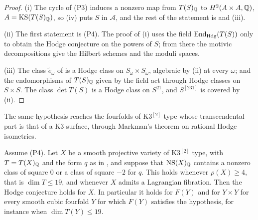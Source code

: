 \begin{proof}
(i) The cycle of (P3) induces a nonzero map from $T(S)_{\mathbb{Q}}$ to
$H^{2}(A\times A,\mathbb{Q})$, $A=\mathrm{KS}(T(S)_{\mathbb{Q}})$, so (iv)
puts $S$ in $\mathcal{A}$, and the rest of the statement is
 and (iii).

(ii) The first statement is (P4). The proof of (i) uses
the field $\operatorname{End}_{\mathrm{Hdg}}(T(S))$ only to obtain the Hodge conjecture on
the powers of $S$; from there the motivic decompositions
\cite{dCM02,Bue20,FFZ21} give the Hilbert schemes and the moduli spaces.

(iii) The class $\tilde e_{\omega}$ of  is a Hodge class on
$S_{\omega}\times S_{\omega}$, algebraic by (ii) at every $\omega$; and the
endomorphisms of $T(S)_{\mathbb{Q}}$ given by the field act through Hodge classes on
$S\times S$. The class $\det T(S)$ is a Hodge class on $S^{21}$, and
$S^{[231]}$ is covered by (ii).
\end{proof}

The same hypothesis reaches the fourfolds of K3$^{[2]}$ type whose
transcendental part is that of a K3 surface, through Markman's theorem on
rational Hodge isometries.

\begin{proposition}\label{prop:k3twosmall}
Assume \textup{(P4)}. Let $X$ be a smooth projective variety of K3$^{[2]}$
type, with $T=T(X)_{\mathbb{Q}}$ and the form $q$ as in , and
suppose that $\mathrm{NS}(X)_{\mathbb{Q}}$ contains a nonzero class of square $0$ or a
class of square $-2$ for $q$. This holds whenever $\rho(X)\ge4$, that is
$\dim T\le19$, and whenever $X$ admits a Lagrangian fibration. Then the
Hodge conjecture holds for $X$. In particular it holds for $F(Y)$ and for
$Y\times Y$ for every smooth cubic fourfold $Y$ for which $F(Y)$ satisfies
the hypothesis, for instance when $\dim T(Y)\le19$.
\end{proposition}

